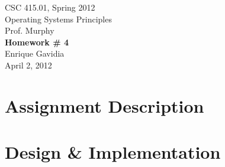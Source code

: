 \documentclass[12pt]{article}
\def \name       {Enrique Gavidia}
\def \coursenum  {CSC 415.01}
\def \coursename {Operating Systems Principles}
\def \instructor {Prof. Murphy}
\def \semester   {Spring 2012}
\def \assignment {Homework \# 4}
\def \duedate    {April 2, 2012}
\newcommand {\makecover} {
  \begin{titlepage}
    \begin{center}
      \LARGE{\coursenum, \semester \\ \coursename}\\
      \Large{\instructor}\\
      \vfill
      \textbf{\Huge \assignment}\\
      \vfill
      \Large{\name}\\
      \large{\duedate}
    \end{center}
  \end{titlepage}
}
\begin{document}
\makecover

\section*{Assignment Description}


%  

\section*{Design \& Implementation}

\end{document}
